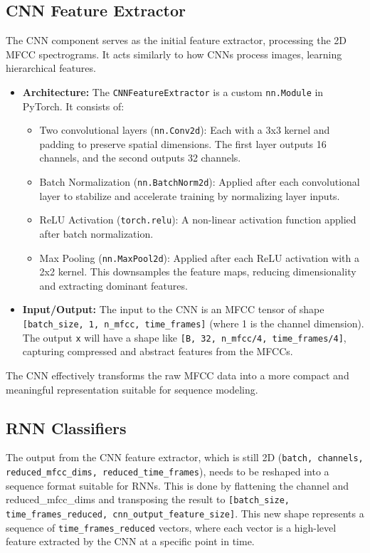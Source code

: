 \documentclass[a4paper]{article}
\begin{document}
\begin{multicols}{2}
\subsection{CNN Feature Extractor}
The CNN component serves as the initial feature extractor, processing the 2D MFCC spectrograms. It acts similarly to how CNNs process images, learning hierarchical features.
\begin{itemize}
    \item \textbf{Architecture:} The \texttt{CNNFeatureExtractor} is a custom \texttt{nn.Module} in PyTorch. It consists of:
        \begin{itemize}
            \item Two convolutional layers (\texttt{nn.Conv2d}): Each with a 3x3 kernel and padding to preserve spatial dimensions. The first layer outputs 16 channels, and the second outputs 32 channels.
            \item Batch Normalization (\texttt{nn.BatchNorm2d}): Applied after each convolutional layer to stabilize and accelerate training by normalizing layer inputs.
            \item ReLU Activation (\texttt{torch.relu}): A non-linear activation function applied after batch normalization.
            \item Max Pooling (\texttt{nn.MaxPool2d}): Applied after each ReLU activation with a 2x2 kernel. This downsamples the feature maps, reducing dimensionality and extracting dominant features.
        \end{itemize}
    \item \textbf{Input/Output:} The input to the CNN is an MFCC tensor of shape \texttt{[batch\_size, 1, n\_mfcc, time\_frames]} (where 1 is the channel dimension). The output \texttt{x} will have a shape like \texttt{[B, 32, n\_mfcc/4, time\_frames/4]}, capturing compressed and abstract features from the MFCCs.
\end{itemize}
The CNN effectively transforms the raw MFCC data into a more compact and meaningful representation suitable for sequence modeling.

\subsection{RNN Classifiers}
The output from the CNN feature extractor, which is still 2D (\texttt{batch, channels, reduced\_mfcc\_dims, reduced\_time\_frames}), needs to be reshaped into a sequence format suitable for RNNs. This is done by flattening the channel and reduced\_mfcc\_dims and transposing the result to \texttt{[batch\_size, time\_frames\_reduced, cnn\_output\_feature\_size]}. This new shape represents a sequence of \texttt{time\_frames\_reduced} vectors, where each vector is a high-level feature extracted by the CNN at a specific point in time.


\end{multicols}
\end{document}
